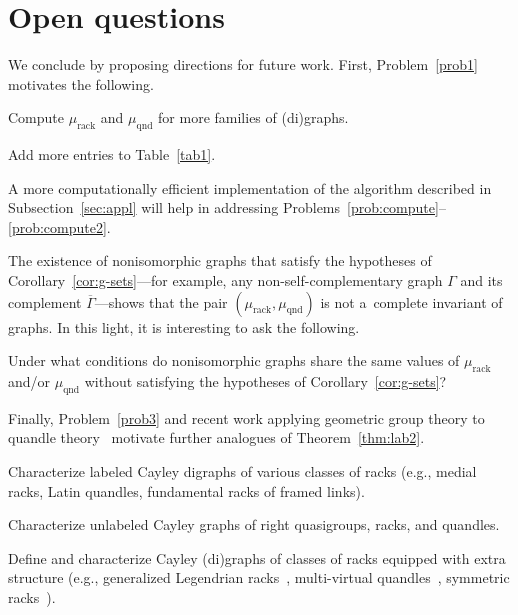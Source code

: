 \documentclass{jonasart}
\DeclareMathOperator{\qnd}{qnd}
\DeclareMathOperator{\rack}{rack}
\begin{document}
	\section{Open questions}\label{sec:6}
	
    We conclude by proposing directions for future work.
	First, Problem~\ref{prob1} motivates the following.
	
    \begin{problem}\label{prob:compute}
		Compute $\mu_{\rack}$ and $\mu_{\qnd}$ for more families of (di)graphs.
	\end{problem}

	\begin{problem}\label{prob:compute2}
		Add more entries to Table~\ref{tab1}.
	\end{problem}
    
	A more computationally efficient implementation of the algorithm described in Subsection~\ref{sec:appl} will help in addressing Problems~\ref{prob:compute}--\ref{prob:compute2}.

	The existence of nonisomorphic graphs that satisfy the hypotheses of Corollary~\ref{cor:g-sets}---for example, any non-self-complementary graph $\Gamma$ and its complement $\overline{\Gamma}$---shows that the pair $(\mu_{\rack},\mu_{\qnd})$ is not a~complete invariant of graphs. In this light, it is interesting to ask the following.
    
	\begin{problem}
		Under what conditions do nonisomorphic graphs share the same values of $\mu_{\rack}$ and/or $\mu_{\qnd}$ without satisfying the hypotheses of Corollary~\ref{cor:g-sets}?
	\end{problem}
    
	Finally, Problem~\ref{prob3} and recent work applying geometric group theory to quandle theory~\cite{metrics, kedra, saraf, kapari} motivate further analogues of Theorem~\ref{thm:lab2}.
	
    \begin{problem}
		Characterize labeled Cayley digraphs of various classes of racks (e.g., medial racks, Latin quandles, fundamental racks of framed links).
	\end{problem}

	\begin{problem}
		Characterize unlabeled Cayley graphs of right quasigroups, racks, and quandles.
	\end{problem}

	\begin{problem}
		Define and characterize Cayley (di)graphs of classes of racks equipped with extra structure (e.g., generalized Legendrian racks~\cite{ta}, multi-virtual quandles~\cite{virtual}, symmetric racks~\cite{ta2}).
	\end{problem}
    
\end{document}
